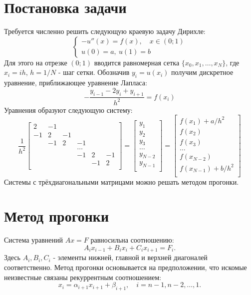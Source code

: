 \documentclass[a4paper,12pt,titlepage,final]{article}
\begin{document}
\section{Постановка задачи}
Требуется численно решить следующую краевую задачу Дирихле:
$$
\begin{cases}
-u''(x) = f(x), \quad x \in (0; 1) \\
u(0) = a, \: u(1) = b
\end{cases}
$$
Для этого на отрезке $(0; 1)$ вводится равномерная сетка $\{x_0, x_1, \ldots, x_N\}$, где $x_i = ih$, $h = 1 / N$ - шаг сетки. Обозначив $y_i = u(x_i)$ получим дискретное уравнение, приближающее уравнение Лапласа:
$$-\frac{y_{i-1} -2y_i + y_{i+1}}{h^2} = f(x_i)$$
Уравнения образуют следующую систему:
$$\frac{1}{h^2}
\begin{bmatrix}
2 & -1 & & & & \\
-1 & 2 & -1 & & & \\
& -1 & 2 & -1 & & \\
& & & \ldots & & \\
& & & -1 & 2 & -1 \\
& & & & -1 & 2 \\
\end{bmatrix} = \begin{bmatrix}
y_1 \\
y_2 \\ 
y_3 \\
\ldots \\
y_{N-2} \\
y_{N-1} \\
\end{bmatrix} = \begin{bmatrix}
f(x_1) + a / h^2 \\
f(x_2) \\ 
f(x_3) \\
\ldots \\
f(x_{N-2}) \\
f(x_{N-1}) + b / h^2 \\
\end{bmatrix} $$
Системы с трёхдиагональными матрицами можно решать методом прогонки.
\section{Метод прогонки}
Система уравнений \( Ax = F \) равносильна соотношению:
\begin{equation}
    A_i x_{i-1} + B_i x_i + C_i x_{i+1} = F_i.
\end{equation}
Здесь $A_i, B_i, C_i$ - элементы нижней, главной и верхней диагоналей соответственно.
Метод прогонки основывается на предположении, что искомые неизвестные связаны рекуррентным соотношением:
\begin{equation}
    x_i = \alpha_{i+1} x_{i+1} + \beta_{i+1}, \quad i = n-1, n-2, \dots, 1.
\end{equation}
\end{document}
